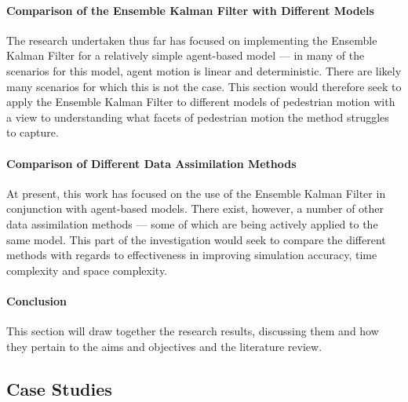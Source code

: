 \paragraph{Comparison of the Ensemble Kalman Filter with Different Models}

The research undertaken thus far has focused on implementing the Ensemble Kalman
Filter for a relatively simple agent-based model --- in many of the scenarios
for this model, agent motion is linear and deterministic.
There are likely many scenarios for which this is not the case.
This section would therefore seek to apply the Ensemble Kalman Filter to
different models of pedestrian motion with a view to understanding what facets
of pedestrian motion the method struggles to capture.

\paragraph{Comparison of Different Data Assimilation Methods}

At present, this work has focused on the use of the Ensemble Kalman Filter in
conjunction with agent-based models.
There exist, however, a number of other data assimilation methods --- some of
which are being actively applied to the same model.
This part of the investigation would seek to compare the different methods with
regards to effectiveness in improving simulation accuracy, time complexity and
space complexity.

\paragraph{Conclusion}

This section will draw together the research results, discussing them and how
they pertain to the aims and objectives and the literature review.

\subsection*{Case Studies}\label{sub:structure:case_studies}

